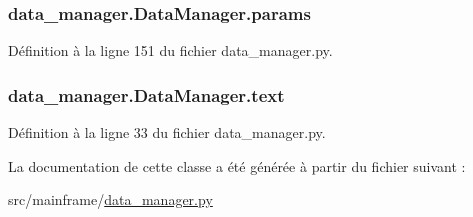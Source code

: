 \subsubsection[{params}]{\setlength{\rightskip}{0pt plus 5cm}data\+\_\+manager.\+Data\+Manager.\+params}\label{classdata__manager_1_1_data_manager_a6f3933032672ae43ca7029531c4178ea}


Définition à la ligne 151 du fichier data\+\_\+manager.\+py.

\hypertarget{classdata__manager_1_1_data_manager_a64c90baeeef1e87cd2bc08228f591be0}{}
\subsubsection[{text}]{\setlength{\rightskip}{0pt plus 5cm}data\+\_\+manager.\+Data\+Manager.\+text}\label{classdata__manager_1_1_data_manager_a64c90baeeef1e87cd2bc08228f591be0}


Définition à la ligne 33 du fichier data\+\_\+manager.\+py.



La documentation de cette classe a été générée à partir du fichier suivant \+:\begin{DoxyCompactItemize}
\item 
src/mainframe/\hyperlink{data__manager_8py}{data\+\_\+manager.\+py}\end{DoxyCompactItemize}

